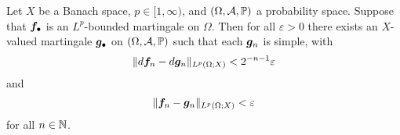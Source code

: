 \begin{lem}\label{lem:mgale-simple-approx}
  Let $X$ be a Banach space, $p \in [1,\infty)$, and $(\Omega,\mathcal{A},\mathbb{P})$ a probability space.
  Suppose that $\bm{f}_{\bullet}$ is an $L^p$-bounded martingale on $\Omega$. 
  Then for all $\varepsilon > 0$ there exists an $X$-valued martingale $\bm{g}_{\bullet}$ on $(\Omega,\mathcal{A},\mathbb{P})$ such that each $\bm{g}_{n}$ is simple, with
  \begin{equation*}
    \|d\bm{f}_{n} - d\bm{g}_{n}\|_{L^p(\Omega;X)} < 2^{-n-1}\varepsilon
  \end{equation*}
  and
  \begin{equation*}
    \|\bm{f}_{n} - \bm{g}_{n}\|_{L^p(\Omega;X)} < \varepsilon
  \end{equation*}
  for all $n \in \mathbb{N}$.
\end{lem}

